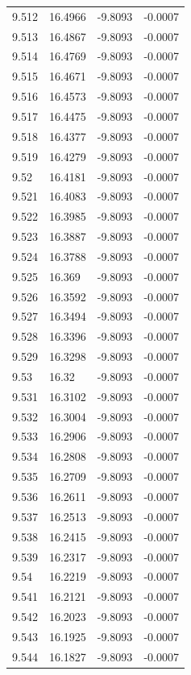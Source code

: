 \begin{tabular}{llll}
9.512 & 16.4966 & -9.8093 & -0.0007 \\
9.513 & 16.4867 & -9.8093 & -0.0007 \\
9.514 & 16.4769 & -9.8093 & -0.0007 \\
9.515 & 16.4671 & -9.8093 & -0.0007 \\
9.516 & 16.4573 & -9.8093 & -0.0007 \\
9.517 & 16.4475 & -9.8093 & -0.0007 \\
9.518 & 16.4377 & -9.8093 & -0.0007 \\
9.519 & 16.4279 & -9.8093 & -0.0007 \\
9.52 & 16.4181 & -9.8093 & -0.0007 \\
9.521 & 16.4083 & -9.8093 & -0.0007 \\
9.522 & 16.3985 & -9.8093 & -0.0007 \\
9.523 & 16.3887 & -9.8093 & -0.0007 \\
9.524 & 16.3788 & -9.8093 & -0.0007 \\
9.525 & 16.369 & -9.8093 & -0.0007 \\
9.526 & 16.3592 & -9.8093 & -0.0007 \\
9.527 & 16.3494 & -9.8093 & -0.0007 \\
9.528 & 16.3396 & -9.8093 & -0.0007 \\
9.529 & 16.3298 & -9.8093 & -0.0007 \\
9.53 & 16.32 & -9.8093 & -0.0007 \\
9.531 & 16.3102 & -9.8093 & -0.0007 \\
9.532 & 16.3004 & -9.8093 & -0.0007 \\
9.533 & 16.2906 & -9.8093 & -0.0007 \\
9.534 & 16.2808 & -9.8093 & -0.0007 \\
9.535 & 16.2709 & -9.8093 & -0.0007 \\
9.536 & 16.2611 & -9.8093 & -0.0007 \\
9.537 & 16.2513 & -9.8093 & -0.0007 \\
9.538 & 16.2415 & -9.8093 & -0.0007 \\
9.539 & 16.2317 & -9.8093 & -0.0007 \\
9.54 & 16.2219 & -9.8093 & -0.0007 \\
9.541 & 16.2121 & -9.8093 & -0.0007 \\
9.542 & 16.2023 & -9.8093 & -0.0007 \\
9.543 & 16.1925 & -9.8093 & -0.0007 \\
9.544 & 16.1827 & -9.8093 & -0.0007 \\

\end{tabular}
